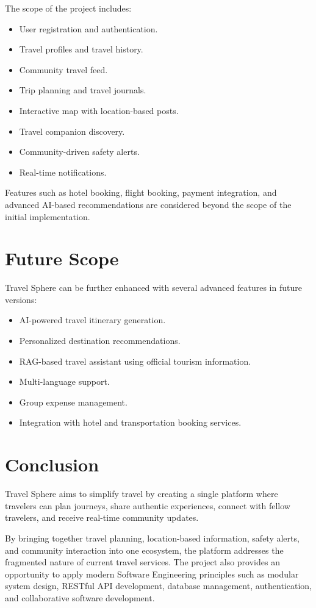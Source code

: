 \documentclass[12pt,a4paper]{article}
\begin{document}
The scope of the project includes:
\begin{itemize}
    \item User registration and authentication.
    \item Travel profiles and travel history.
    \item Community travel feed.
    \item Trip planning and travel journals.
    \item Interactive map with location-based posts.
    \item Travel companion discovery.
    \item Community-driven safety alerts.
    \item Real-time notifications.
\end{itemize}

Features such as hotel booking, flight booking, payment integration, and advanced AI-based recommendations are considered beyond the scope of the initial implementation.

\section{Future Scope}
Travel Sphere can be further enhanced with several advanced features in future versions:
\begin{itemize}
    \item AI-powered travel itinerary generation.
    \item Personalized destination recommendations.
    \item RAG-based travel assistant using official tourism information.
    \item Multi-language support.
    \item Group expense management.
    \item Integration with hotel and transportation booking services.
\end{itemize}

\section{Conclusion}
Travel Sphere aims to simplify travel by creating a single platform where travelers can plan journeys, share authentic experiences, connect with fellow travelers, and receive real-time community updates.

By bringing together travel planning, location-based information, safety alerts, and community interaction into one ecosystem, the platform addresses the fragmented nature of current travel services. The project also provides an opportunity to apply modern Software Engineering principles such as modular system design, RESTful API development, database management, authentication, and collaborative software development.
\end{document}
